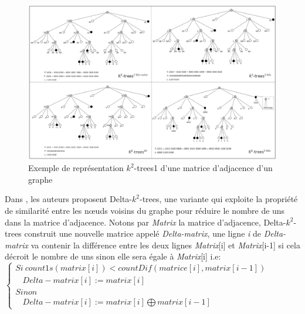 \begin{figure}[H]
\begin{center}
\includegraphics[height=300 pt, width=450 pt]{./ressources/image/k2-trees1.png} 
\end{center}
\caption{Exemple de représentation $k^2$-trees1 d'une matrice d'adjacence d'un graphe}
\label{k2-trees1-exemple}
\end{figure}



Dans \citep{zhang2014delta}, les auteurs proposent Delta-$k^2$-trees, une variante qui exploite la propriété de similarité entre les nœuds voisins du graphe pour réduire le nombre de uns dans la matrice d'adjacence. Notons par \textit{Matrix} la matrice d'adjacence, Delta-$k^2$-trees construit une nouvelle matrice appelé \textit{Delta-matrix}, une ligne \textit{i} de \textit{Delta-matrix} va contenir la différence entre les deux lignes \textit{Matrix}[i] et  \textit{Matrix}[i-1] si cela décroit le nombre de uns sinon elle sera égale à \textit{Matrix}[i] i.e: \\

$\left\{
\begin{array}{llcl}
Si\ count1s(matrix[i]) < countDif(matrice[i],matrix[i-1])\\
\ \ \ \ Delta-matrix[i]  := matrix[i]  \\
Sinon & & &\\
\ \ \ \ Delta-matrix[i]  := matrix[i] \bigoplus matrix[i-1] & 
\end{array}
\right.$\\

